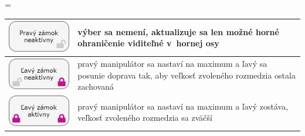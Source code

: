 \documentclass[
  printed, %
  twoside, %
  notable,   %
  nolof,   %
  nolot,   %
]{fithesis3}
\begin{document}
\begin{center}
\tabulinesep=\tabcolsep
  \begin{tabu}{ X[2,c,m] | X[7,c,m] }
    \includegraphics[width=1\linewidth]{right_unlock} & výber sa nemení, aktualizuje sa len možné horné ohraničenie viditeľné v~hornej osy \\ \hline
    \includegraphics[width=1\linewidth]{left_unlock} & pravý manipulátor sa nastaví na maximum a ľavý sa posunie doprava tak, aby veľkosť zvoleného rozmedzia ostala zachovaná \\ \hline
    \includegraphics[width=1\linewidth]{left_lock} & pravý manipulátor sa nastaví na maximum a ľavý zostáva, veľkosť zvoleného rozmedzia sa zväčší \ \
  \end{tabu}
\end{center}
\end{document}
